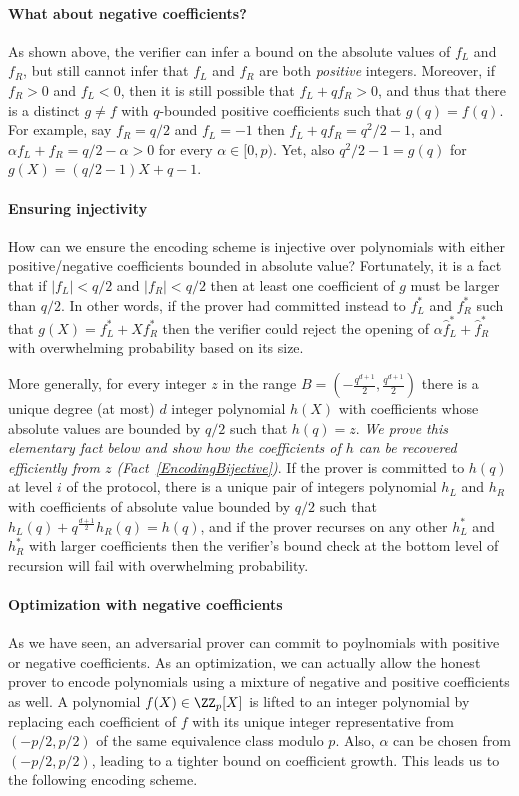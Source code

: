 \paragraph{What about negative coefficients?} 
As shown above, the verifier can infer a bound on the absolute values of $f_L$ and $f_R$, but still cannot infer that $f_L$ and $f_R$ are both \emph{positive} integers. Moreover, if $f_R > 0$ and $f_L < 0$, then it is still possible that $f_L + q f_R > 0$, and thus that there is a distinct $g \neq f$ with $q$-bounded positive coefficients such that $g(q) = f(q)$. For example, say $f_R = q/2$ and $f_L = -1$ then $f_L + q f_R = q^2/2 - 1$, and $\alpha f_L + f_R  = q/2 - \alpha > 0$ for every $\alpha \in [0,p)$. Yet, also $q^2/2 - 1 = g(q)$ for $g(X) = (q/2 - 1)X + q-1$. 

\paragraph{Ensuring injectivity} How can we ensure the encoding scheme is injective over polynomials with either positive/negative coefficients bounded in absolute value? Fortunately, it is a fact that if $|f_L| < q/2$ and $|f_R| < q/2$ then at least one coefficient of $g$ must be larger than $q/2$. In other words, if the prover had committed instead to $f^*_L$ and $f^*_R$ such that $g(X) = f^*_L + Xf^*_R$ then the verifier could reject the opening of $\alpha \hat{f}^*_L + \hat{f}^*_R$ with overwhelming probability based on its size. 


More generally, for every integer $z$ in the range $B = (-\frac{q^{d+1}}{2}, \frac{q^{d+1}}{2})$ there is a unique degree (at most) $d$ integer polynomial $h(X)$ with coefficients whose absolute values are bounded by $q/2$ such that $h(q) = z$. \emph{We prove this elementary fact below and show how the coefficients of $h$ can be recovered efficiently from $z$ (Fact~\ref{EncodingBijective})}. If the prover is committed to $h(q)$ at level $i$ of the protocol, there is a unique pair of integers polynomial $h_L$ and $h_R$ with coefficients of absolute value bounded by $q/2$ such that $h_L(q) + q^{\frac{d+1}{2}} h_R(q) = h(q)$, and if the prover recurses on any other $h_L^*$ and $h_R^*$ with larger coefficients then the verifier's bound check at the bottom level of recursion will fail with overwhelming probability. 

\paragraph{Optimization with negative coefficients} As we have seen, an adversarial prover can commit to poylnomials with positive or negative coefficients. As an optimization, we can actually allow the honest prover to encode polynomials using a mixture of negative and positive coefficients as well. A polynomial $f(X) \in \ZZ_p[X]$ is lifted to an integer polynomial by replacing each coefficient of $f$ with its unique integer representative from $(-p/2,p/2)$ of the same equivalence class modulo $p$. Also, $\alpha$ can be chosen from $(-p/2, p/2)$, leading to a tighter bound on coefficient growth. This leads us to the following encoding scheme. 


